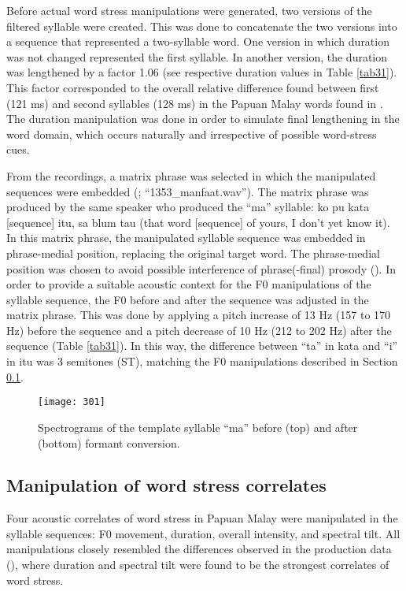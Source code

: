 Before actual word stress manipulations were generated, two versions of the filtered syllable were created. This was done to concatenate the two versions into a sequence that represented a two-syllable word. One version in which duration was not changed represented the first syllable. In another version, the duration was lengthened by a factor 1.06 (see respective duration values in Table \ref{tab31}). This factor corresponded to the overall relative difference found between first (121 ms) and second syllables (128 ms) in the Papuan Malay words found in . The duration manipulation was done in order to simulate final lengthening in the word domain, which occurs naturally and irrespective of possible word-stress cues.

From the recordings, a matrix phrase was selected in which the manipulated sequences were embedded (\citealt{kluge_papuan_2014}; ``1353\_manfaat.wav''). The matrix phrase was produced by the same speaker who produced the ``ma'' syllable: ko pu kata [sequence] itu, sa blum tau (that word [sequence] of yours, I don't yet know it). In this matrix phrase, the manipulated syllable sequence was embedded in phrase-medial position, replacing the original target word. The phrase-medial position was chosen to avoid possible interference of phrase(-final) prosody (\citealt{kaland_different_2019}). In order to provide a suitable acoustic context for the F0 manipulations of the syllable sequence, the F0 before and after the sequence was adjusted in the matrix phrase. This was done by applying a pitch increase of 13 Hz (157 to 170 Hz) before the sequence and a pitch decrease of 10 Hz (212 to 202 Hz) after the sequence (Table \ref{tab31}). In this way, the difference between ``ta'' in kata and ``i'' in itu was 3 semitones (ST), matching the F0 manipulations described in Section \ref{sec322}.


\begin{figure}
\texttt{[image: 301]}
\caption{Spectrograms of the template syllable ``ma'' before (top) and after (bottom) formant conversion.}\label{fig301}
\end{figure}

\subsection{Manipulation of word stress correlates} \label{sec322}
Four acoustic correlates of word stress in Papuan Malay were manipulated in the syllable sequences: F0 movement, duration, overall intensity, and spectral tilt. All manipulations closely resembled the differences observed in the production data (), where duration and spectral tilt were found to be the strongest correlates of word stress.


